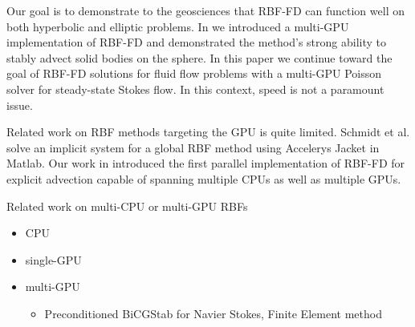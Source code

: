 
Our goal is to demonstrate to the geosciences that RBF-FD can function well on
both hyperbolic and elliptic problems. In \cite{bolligFlyerErlebacher2011} we
introduced a multi-GPU implementation of RBF-FD and demonstrated the method's
strong ability to stably advect solid bodies on the sphere. In this paper we
continue toward the goal of RBF-FD solutions for fluid flow problems with a
multi-GPU Poisson solver for steady-state Stokes flow. In this context, speed is
not a paramount issue.

Related work on RBF methods targeting the GPU is quite limited. Schmidt et al.
\cite{Schmidt2009b} solve an implicit system for a global RBF method using
Accelerys Jacket in Matlab. Our work in \cite{Bollig2011} introduced the first
parallel implementation of RBF-FD for explicit advection capable of spanning
multiple CPUs as well as multiple GPUs. 

Related work on multi-CPU or multi-GPU RBFs
\begin{itemize} 
	\item CPU \cite{Yokota2010} \cite{Wildemann2009}
	\item single-GPU \cite{Schmidt2009b}
	\item multi-GPU 
	\begin{itemize} 
	\item Preconditioned BiCGStab for Navier Stokes, Finite Element method \cite{Goeddeke2009a} 
	\end{itemize} 
\end{itemize} 

